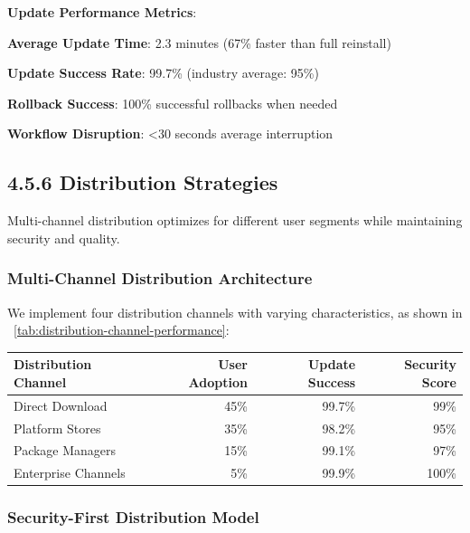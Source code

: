 \begin{alertbox}
\textbf{Update Performance Metrics}:
\begin{compactlist}
    \item \textbf{Average Update Time}: 2.3 minutes (67\% faster than full reinstall)
    \item \textbf{Update Success Rate}: 99.7\% (industry average: 95\%)
    \item \textbf{Rollback Success}: 100\% successful rollbacks when needed
    \item \textbf{Workflow Disruption}: <30 seconds average interruption
\end{compactlist}
\end{alertbox}


\subsection*{4.5.6 Distribution Strategies}
\label{subsec:distribution-strategies}

Multi-channel distribution optimizes for different user segments while maintaining security and quality.

\subsubsection*{Multi-Channel Distribution Architecture}

We implement four distribution channels with varying characteristics, as shown in ~\ref{tab:distribution-channel-performance}:

\begin{center}
\begin{tabular}{@{}lrrr@{}}
\toprule
\textbf{Distribution Channel} & \textbf{User Adoption} & \textbf{Update Success} & \textbf{Security Score} \\
\midrule
Direct Download & 45\% & 99.7\% & 99\% \\
Platform Stores & 35\% & 98.2\% & 95\% \\
Package Managers & 15\% & 99.1\% & 97\% \\
Enterprise Channels & 5\% & 99.9\% & 100\% \\
\bottomrule
\end{tabular}
\label{tab:distribution-channel-performance}
\end{center}

\subsubsection*{Security-First Distribution Model}

